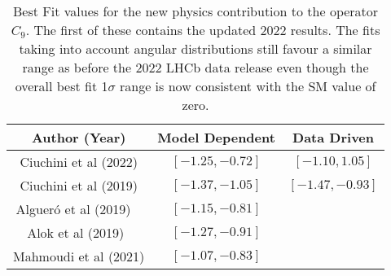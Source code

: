 \documentclass[12pt]{revtex4-2}
\numberwithin{equation}{section}
\begin{document}
\begin{table*}[b]
\begin{center}
\renewcommand{\arraystretch}{1.5}
\begin{tabular}{|c|c|c|}
     \hline
     Author (Year) & Model Dependent & Data Driven \\
     \hline
     Ciuchini et al (2022) \cite{Ciuchini:2022wbq}& $[-1.25, -0.72]$  & $[-1.10, 1.05]$ \\
     \hline
     Ciuchini et al (2019)  \cite{Ciuchini:2019usw} & $[-1.37, -1.05]$& $[-1.47, -0.93]$ \\
     Alguer\'o et al (2019) ~\cite{Alguero:2019ptt} & $[-1.15, -0.81]$ & \\
     Alok et al (2019)~\cite{Alok:2019ufo}  &$ [-1.27, -0.91] $& \\
     Mahmoudi et al (2021)  \cite{Hurth:2021nsi} & $[-1.07, -0.83]$& \\
     \hline
     
\end{tabular}
\end{center}
\caption{Best Fit values for the new physics contribution to the operator $C_9$. The first of these contains the updated 2022 results.  The fits taking into account angular distributions still favour a similar range as before the 2022 LHCb data release even though the overall best fit 1$\sigma$ range is now consistent with the SM value of zero. }
\label{tab:c9fit}
\end{table*} 
\end{document}
